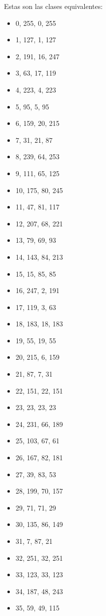 \documentclass[12pt, fleqn]{report}                             %
\theoremstyle{break}                                            %
\begin{document}
      Estas son las clases equivalentes:
      \begin{itemize}
        \item 0, 255, 0, 255
        \item 1, 127, 1, 127
        \item 2, 191, 16, 247
        \item 3, 63, 17, 119
        \item 4, 223, 4, 223
        \item 5, 95, 5, 95
        \item 6, 159, 20, 215
        \item 7, 31, 21, 87
        \item 8, 239, 64, 253
        \item 9, 111, 65, 125
        \item 10, 175, 80, 245
        \item 11, 47, 81, 117
        \item 12, 207, 68, 221
        \item 13, 79, 69, 93
        \item 14, 143, 84, 213
        \item 15, 15, 85, 85
        \item 16, 247, 2, 191
        \item 17, 119, 3, 63
        \item 18, 183, 18, 183
        \item 19, 55, 19, 55
        \item 20, 215, 6, 159
        \item 21, 87, 7, 31
        \item 22, 151, 22, 151
        \item 23, 23, 23, 23
        \item 24, 231, 66, 189
        \item 25, 103, 67, 61
        \item 26, 167, 82, 181
        \item 27, 39, 83, 53
        \item 28, 199, 70, 157
        \item 29, 71, 71, 29
        \item 30, 135, 86, 149
        \item 31, 7, 87, 21
        \item 32, 251, 32, 251
        \item 33, 123, 33, 123
        \item 34, 187, 48, 243
        \item 35, 59, 49, 115

\end{itemize}
\end{document}
